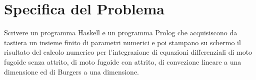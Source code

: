 \section{Specifica del Problema}

Scrivere un programma Haskell e un programma Prolog che acquisiscono da tastiera un insieme finito di parametri numerici e poi stampano su schermo il risultato del calcolo numerico per l’integrazione di equazioni differenziali di moto fugoide senza attrito, di moto fugoide con attrito, di convezione lineare a una dimensione ed di Burgers a una dimensione.
